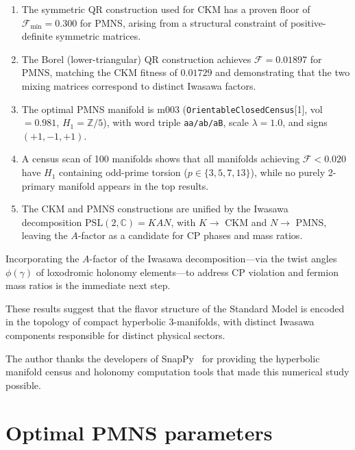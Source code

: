 \documentclass[floatfix,aps,prd,twocolumn,showpacs,superscriptaddress,longbibliography]{revtex4-2}
\newcommand{\PSL}{\mathrm{PSL}(2,\mathbb{C})}
\begin{document}
\begin{enumerate}
\item The symmetric QR construction used for CKM has a proven
floor of $\mathcal{F}_{\min} = 0.300$ for PMNS, arising from a
structural constraint of positive-definite symmetric matrices.

\item The Borel (lower-triangular) QR construction achieves
$\mathcal{F} = 0.01897$ for PMNS, matching the CKM fitness of
$0.01729$ and demonstrating that the two mixing matrices
correspond to distinct Iwasawa factors.

\item The optimal PMNS manifold is m003
(\texttt{OrientableClosedCensus}[1], vol $= 0.981$,
$H_1 = \mathbb{Z}/5$), with word triple \texttt{aa/ab/aB},
scale $\lambda = 1.0$, and signs $(+1, -1, +1)$.

\item A census scan of 100 manifolds shows that all manifolds
achieving $\mathcal{F} < 0.020$ have $H_1$ containing odd-prime
torsion ($p \in \{3, 5, 7, 13\}$), while no purely 2-primary manifold
appears in the top results.

\item The CKM and PMNS constructions are unified by the Iwasawa
decomposition $\PSL = KAN$, with $K \to$ CKM and $N \to$ PMNS,
leaving the $A$-factor as a candidate for CP phases and mass ratios.
\end{enumerate}

Incorporating the $A$-factor of the Iwasawa decomposition---via
the twist angles $\phi(\gamma)$ of loxodromic holonomy elements---to
address CP violation and fermion mass ratios is the immediate next step.

These results suggest that the flavor structure of the Standard Model
is encoded in the topology of compact hyperbolic 3-manifolds, with distinct Iwasawa components responsible for distinct physical sectors.

\begin{acknowledgments}
The author thanks the developers of SnapPy~\cite{snappy} for
providing the hyperbolic manifold census and holonomy computation
tools that made this numerical study possible.
\end{acknowledgments}

\appendix

\section{Optimal PMNS parameters}
\label{app:params}
\end{document}
